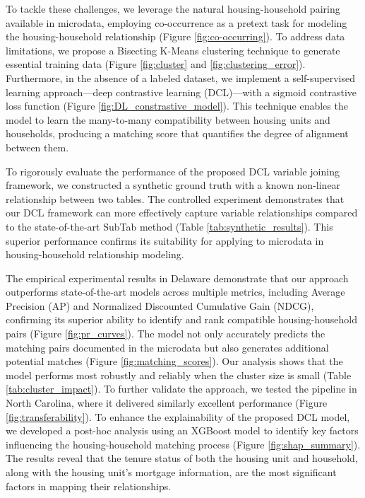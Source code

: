 \documentclass[]{nature_mod}
\begin{document}
To tackle these challenges, we leverage the natural housing-household pairing available in microdata, employing co-occurrence as a pretext task for modeling the housing-household relationship (Figure \ref{fig:co-occurring}). To address data limitations, we propose a Bisecting K-Means clustering technique to generate essential training data (Figure \ref{fig:cluster} and \ref{fig:clustering_error}). Furthermore, in the absence of a labeled dataset, we implement a self-supervised learning approach—deep contrastive learning (DCL)—with a sigmoid contrastive loss function (Figure \ref{fig:DL_constrastive_model}). This technique enables the model to learn the many-to-many compatibility between housing units and households, producing a matching score that quantifies the degree of alignment between them.

To rigorously evaluate the performance of the proposed DCL variable joining framework, we constructed a synthetic ground truth with a known non-linear relationship between two tables. The controlled experiment demonstrates that our DCL framework can more effectively capture variable relationships compared to the state-of-the-art SubTab method (Table \ref{tab:synthetic_results}). This superior performance confirms its suitability for applying to microdata in housing-household relationship modeling.

The empirical experimental results in Delaware demonstrate that our approach outperforms state-of-the-art models across multiple metrics, including Average Precision (AP) and Normalized Discounted Cumulative Gain (NDCG), confirming its superior ability to identify and rank compatible housing-household pairs (Figure \ref{fig:pr_curves}). The model not only accurately predicts the matching pairs documented in the microdata but also generates additional potential matches (Figure \ref{fig:matching_scores}). Our analysis shows that the model performs most robustly and reliably when the cluster size is small (Table \ref{tab:cluster_impact}). To further validate the approach, we tested the pipeline in North Carolina, where it delivered similarly excellent performance (Figure \ref{fig:transferability}). To enhance the explainability of the proposed DCL model, we developed a post-hoc analysis using an XGBoost model to identify key factors influencing the housing-household matching process (Figure \ref{fig:shap_summary}). The results reveal that the tenure status of both the housing unit and household, along with the housing unit's mortgage information, are the most significant factors in mapping their relationships.
\end{document}
